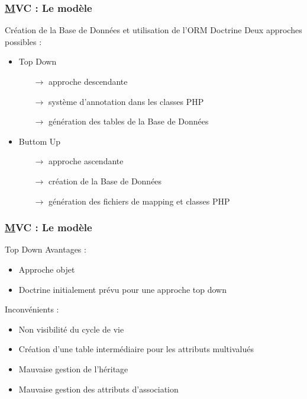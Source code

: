 \begin{frame}
	\frametitle{\underline{M}VC : Le modèle}
	
	\begin{block}{Création de la Base de Données et utilisation de l'ORM Doctrine}
		Deux approches possibles : 
		\begin{itemize}
			\item Top Down
				\begin{itemize}
					\item[$\rightarrow$] approche descendante
					\item[$\rightarrow$] système d'annotation dans les classes PHP
					\item[$\rightarrow$] génération des tables de la Base de Données
				\end{itemize}
			\item Buttom Up
				\begin{itemize}
					\item[$\rightarrow$] approche ascendante
					\item[$\rightarrow$] création de la Base de Données
					\item[$\rightarrow$] génération des fichiers de mapping et classes PHP
				\end{itemize}
		\end{itemize}
	\end{block} 

	
\end{frame}



\speaker{\Julie}
\begin{frame}
	\frametitle{\underline{M}VC : Le modèle}
	\begin{block}{Top Down}
		Avantages :
		\begin{itemize}
			\item Approche objet
			\item Doctrine initialement prévu pour une approche top down
		\end{itemize}
 
		Inconvénients :
		\begin{itemize}
			\item Non visibilité du cycle de vie
			\item Création d'une table intermédiaire pour les attributs multivalués
			\item Mauvaise gestion de l'héritage
			\item Mauvaise gestion des attributs d'association
			
		\end{itemize}
	\end{block}
\end{frame}

